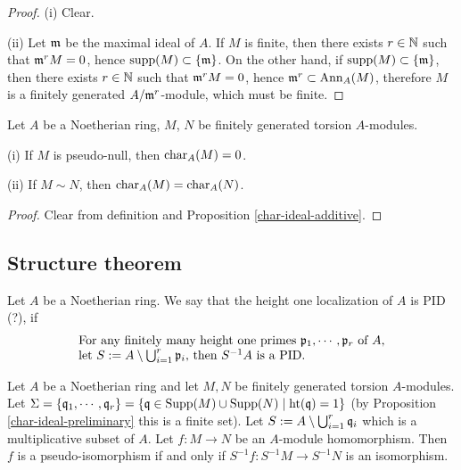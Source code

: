 \begin{proof}
(i) Clear.

(ii) Let ${\mathfrak{m}}$ be the maximal ideal of $A$.
If $M$ is finite, then there exists $r\in{\mathbb {N}}$
such that ${\mathfrak{m}}^rM=0$, hence ${\mathrm{supp}}(M)\subset\{{\mathfrak{m}}\}$.
On the other hand, if ${\mathrm{supp}}(M)\subset\{{\mathfrak{m}}\}$,
then there exists $r\in{\mathbb {N}}$
such that ${\mathfrak{m}}^rM=0$, hence ${\mathfrak{m}}^r\subset{\mathrm{Ann}}_A(M)$, therefore
$M$ is a finitely generated $A/{\mathfrak{m}}^r$-module, which must be finite.
\end{proof}

\begin{prop}
\label{pseudo-null-char-ideal}
Let $A$ be a Noetherian ring, $M$, $N$ be finitely generated torsion $A$-modules.

{\rm(i)} If $M$ is pseudo-null, then $\operatorname{char}_A(M)=0$.

{\rm(ii)} If $M\sim N$, then $\operatorname{char}_A(M)=\operatorname{char}_A(N)$.
\end{prop}

\begin{proof}
Clear from definition and Proposition \ref{char-ideal-additive}.
\end{proof}

\subsection{Structure theorem}

\begin{definition}
\label{ht-1-localization-is-PID}
Let $A$ be a Noetherian ring.
We say that the height one localization of $A$ is PID (?), if
\begin{equation}
\label{eqn:ht-1-localization-is-PID}
\begin{array}{l}
\text{For any finitely many height one primes ${\mathfrak{p}}_1,\cdots,{\mathfrak{p}}_r$ of $A$,}\\
\text{let $S:=A\setminus\bigcup_{i=1}^r{\mathfrak{p}}_i$, then $S^{-1}A$ is a PID.}
\end{array}
\end{equation}
\end{definition}

\begin{lem}
\label{pis-iff}
Let $A$ be a Noetherian ring and let
$M,N$ be finitely generated torsion $A$-modules.
Let $\Sigma=\{{\mathfrak{q}}_1,\cdots,{\mathfrak{q}}_r\}
=\{{\mathfrak{q}}\in{\mathrm{Supp}}(M)\cup{\mathrm{Supp}}(N)\mid{\mathrm{ht}}({\mathfrak{q}})=1\}$
(by Proposition \ref{char-ideal-preliminary} this is a finite set).
Let $S:=A\setminus\bigcup_{i=1}^r{\mathfrak{q}}_i$ which is a multiplicative subset of $A$.
Let $f:M\to N$ be an $A$-module homomorphism.
Then $f$ is a pseudo-isomorphism if and only if $S^{-1}f:S^{-1}M\to S^{-1}N$
is an isomorphism.
\end{lem}

